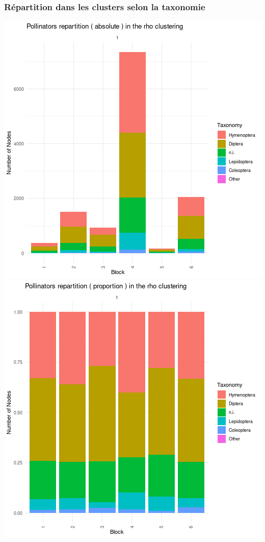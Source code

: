 \hypertarget{ruxe9partition-dans-les-clusters-selon-la-taxonomie-2}{%
\subsubsection{Répartition dans les clusters selon la
taxonomie}\label{ruxe9partition-dans-les-clusters-selon-la-taxonomie-2}}

\includegraphics{figure/rho_plot_taxonomy_pollinators-1.png}\includegraphics{figure/rho_plot_taxonomy_pollinators-2.png}

